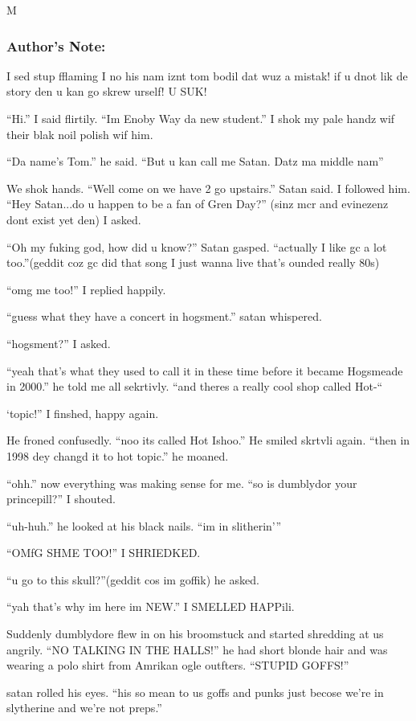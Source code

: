 M\documentclass{article}
\begin{document}
\subsubsection*{Author's Note: }I sed stup fflaming I no his nam iznt tom bodil dat wuz a mistak! if u dnot lik de story den u kan go skrew urself! U SUK!

\textbreak
\linenumbers\resetlinenumber

“Hi.” I said flirtily. “Im Enoby Way da new student.” I shok my pale handz wif their blak noil polish wif him.

“Da name’s Tom.” he said. “But u kan call me Satan. Datz ma middle nam”

We shok hands. “Well come on we have 2 go upstairs.” Satan said. I followed him. “Hey Satan...do u happen to be a fan of Gren Day?” (sinz mcr and evinezenz dont exist yet den) I asked.

“Oh my fuking god, how did u know?” Satan gasped. “actually I like gc a lot too.”(geddit coz gc did that song I just wanna live that’s ounded really 80s)

“omg me too!” I replied happily.

“guess what they have a concert in hogsment.” satan whispered.

“hogsment?” I asked.

“yeah that’s what they used to call it in these time before it became Hogsmeade in 2000.” he told me all sekrtivly. “and theres a really cool shop called Hot-“

‘topic!” I finshed, happy again.

He froned confusedly. “noo its called Hot Ishoo.” He smiled skrtvli again. “then in 1998 dey changd it to hot topic.” he moaned.

“ohh.” now everything was making sense for me. “so is dumblydor your princepill?” I shouted.

“uh-huh.” he looked at his black nails. “im in slitherin’”

“OMfG SHME TOO!” I SHRIEDKED.

“u go to this skull?”(geddit cos im goffik) he asked.

“yah that’s why im here im NEW.” I SMELLED HAPPili.

Suddenly dumblydore flew in on his broomstuck and started shredding at us angrily. “NO TALKING IN THE HALLS!” he had short blonde hair and was wearing a polo shirt from Amrikan ogle outfters. “STUPID GOFFS!”

satan rolled his eyes. “his so mean to us goffs and punks just becose we’re in slytherine and we’re not preps.”
\end{document}
